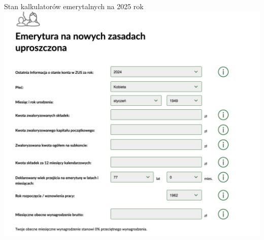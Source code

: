 \begin{frame}[t]{Stan kalkulatorów emerytalnych na 2025 rok}
\includegraphics[width=.8\textwidth]{img/zus_calculator_03}
\end{frame}
